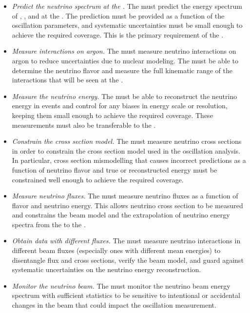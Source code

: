 \begin{itemize}
    \item  \textit{Predict the neutrino spectrum at the .} The  must predict the energy spectrum of \numu, \anumu, \nue and \anue at the . The prediction must be provided as a function of the oscillation parameters, and systematic uncertainties must be small enough to achieve the required  coverage. This is the primary requirement of the  .
    
    \item \textit{Measure interactions on argon.} The  must measure neutrino interactions on argon to reduce uncertainties due to nuclear modeling. The  must be able to determine the neutrino flavor and measure the full kinematic range of the interactions that will be seen at the .
    
    \item \textit{Measure the neutrino energy.} The  must be able to reconstruct the neutrino energy in  events and control for any biases in energy scale or resolution, keeping them small enough to achieve the required  coverage. These measurements must also be transferable to the . 
    
    \item \textit{Constrain the cross section model.} The  must measure neutrino cross sections in order to constrain the cross section model used in the oscillation analysis. In particular, cross section mismodelling that causes incorrect  predictions as a function of neutrino flavor and true or reconstructed energy must be constrained well enough to achieve the required  coverage. 
    
    \item \textit{Measure neutrino fluxes.} The  must measure neutrino fluxes as a function of flavor and neutrino energy. This allows neutrino cross section to be measured and constrains the beam model and the extrapolation of neutrino energy spectra from the  to the .
    
    \item \textit{Obtain data with different fluxes.} The  must measure neutrino interactions in different beam fluxes (especially ones with different mean energies) to disentangle flux and cross sections, verify the beam model, and guard against systematic uncertainties on the neutrino energy reconstruction.
    
    \item \textit{Monitor the neutrino beam.} The  must monitor the neutrino beam energy spectrum with sufficient statistics to be sensitive to intentional or accidental changes in the beam that could impact the oscillation measurement. 
    
\end{itemize}


